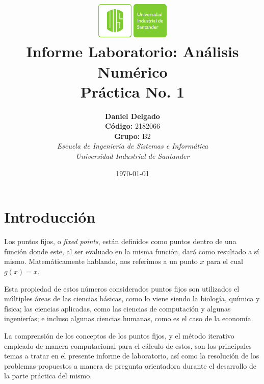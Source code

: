\documentclass[spanish,notitlepage,letterpaper, 10pt]{article} %
\newcommand{\university}{\normalsize Universidad Industrial de Santander}
\newcommand{\faculty}{\normalsize  Escuela de Ingenier\'ia de Sistemas e Inform\'atica}
\newcommand{\codigo}{\normalsize  2182066}
\newcommand{\grupo}{\normalsize  B2}
\begin{document}
\title{	\vspace{-12mm}\includegraphics[width=0.2\linewidth]{Logos/UIS.pdf}\\Informe Laboratorio: Análisis Numérico\\  \centering Práctica No. 1}
\author{
\textbf{Daniel Delgado} \\ \textbf{Código:} \codigo\\
\textbf{Grupo:} \grupo\\
\textit{\faculty}\\
\textit{\university}}
\date{\today}
\maketitle

\section{Introducción}
Los puntos fijos, o \textit{fixed points}, están definidos como puntos dentro de una función donde este, al ser evaluado en la misma función, dará como resultado a sí mismo. Matemáticamente hablando, nos referimos a un punto $x$ para el cual $g(x)=x$. 

Esta propiedad de estos números considerados puntos fijos son utilizados el múltiples áreas de las ciencias básicas, como lo viene siendo la biología, química y física; las ciencias aplicadas, como las ciencias de computación y algunas ingenierías; e incluso algunas ciencias humanas, como es el caso de la economía.

La comprensión de los conceptos de los puntos fijos, y el método iterativo empleado de manera computacional para el cálculo de estos, son los principales temas a tratar en el presente informe de laboratorio, así como la resolución de los problemas propuestos a manera de pregunta orientadora durante el desarrollo de la parte práctica del mismo.  
\end{document}
